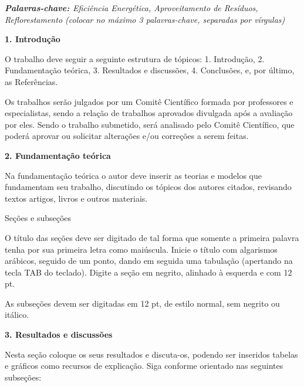 \documentclass[12pt, a4paper]{article}
\begin{document}
    \noindent
    \textit{\textbf{\small{Palavras-chave: }}\small{Eficiência Energética, Aproveitamento de Resíduos, Reflorestamento (colocar no máximo 3 palavras-chave, separadas por vírgulas)}}
    \vspace{1cm}
    
\noindent
\textbf{1. \quad Introdução}
\vspace{0.5cm}

O trabalho deve seguir a seguinte estrutura de tópicos: 1. Introdução, 2. Fundamentação teórica, 3. Resultados e discussões, 4. Conclusões, e, por último, as Referências.

 Os trabalhos serão julgados por um Comitê Científico formada por professores e especialistas, sendo a relação de trabalhos aprovados divulgada após a avaliação por eles. Sendo o trabalho submetido, será analisado pelo Comitê Científico, que poderá aprovar ou solicitar alterações e/ou correções a serem feitas.
\vspace{0.5cm}

\noindent
\textbf{2. \quad Fundamentação teórica}
\vspace{0.5cm}

Na fundamentação teórica o autor deve inserir as teorias e modelos que fundamentam seu trabalho, discutindo os tópicos dos autores citados, revisando textos artigos, livros e outros materiais.
\vspace{0.5cm}

 \quad Seções e subseções
\vspace{0.5cm}

O título das seções deve ser digitado de tal forma que somente a primeira palavra tenha por sua primeira letra como maiúscula. Inicie o título com algarismos arábicos, seguido de um ponto, dando em seguida uma tabulação (apertando na tecla TAB do teclado). Digite a seção em negrito, alinhado à esquerda e com 12 pt. 

As subseções devem ser digitadas em 12 pt, de estilo normal, sem negrito ou itálico.
\vspace{0.5cm}

\noindent
\textbf{3. \quad Resultados e discussões}
\vspace{0.5cm}

Nesta seção coloque os seus resultados e discuta-os, podendo ser inseridos tabelas e gráficos como recursos de explicação. Siga conforme orientado nas seguintes subseções:
\vspace{0.5cm}
\end{document}
